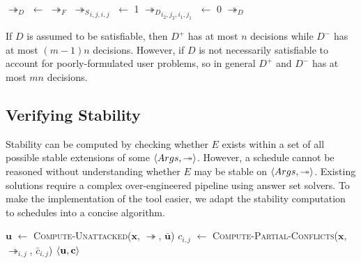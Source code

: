 \begin{algorithm}[H]
	\caption{}
	\begin{algorithmic}[1]
			\State $\twoheadrightarrow_D$ $\gets$ $\twoheadrightarrow_F$
				\State ${\twoheadrightarrow_S}_{i,j,i,j}$ $\gets$ 1
			\EndFor
					\State ${\twoheadrightarrow_D}_{i_2,j_2,i_1,j_1}$ $\gets$ 0				
				\EndFor
			\EndFor
			\State \Return $\twoheadrightarrow_D$
		\EndFunction
	\end{algorithmic}
\end{algorithm}

If $D$ is assumed to be satisfiable, then $D^+$ has at most $n$ decisions while $D^-$ has at most $(m-1)n$ decisions. However, if $D$ is not necessarily satisfiable to account for poorly-formulated user problems, so in general $D^+$ and $D^-$ has at most $mn$ decisions.

\subsection{Verifying Stability}
\label{verifyingstability}

Stability can be computed by checking whether $E$ exists within a set of all possible stable extensions of some $\langle{Args},{\twoheadrightarrow}\rangle$. However, a schedule cannot be reasoned without understanding whether $E$ may be stable on $\langle{Args},{\twoheadrightarrow}\rangle$. Existing solutions require a complex over-engineered pipeline using answer set solvers. To make the implementation of the tool easier, we adapt the stability computation to schedules into a concise algorithm.

\begin{algorithm}[H]
	\caption{}
	\begin{algorithmic}[1]
			\State $\mathbf{u}$ $\gets$ \textsc{Compute-Unattacked}($\mathbf{x}$, $\twoheadrightarrow$, $\bar{\mathbf{u}}$)
				\State $c_{i,j}$ $\gets$ \textsc{Compute-Partial-Conflicts}($\mathbf{x}$, $\twoheadrightarrow_{i,j}$, $\bar{c}_{i,j}$)
			\EndFor			
			\State \Return $\langle{\mathbf{u}},{\mathbf{c}}\rangle$
		\EndFunction
	\end{algorithmic}
\end{algorithm}

